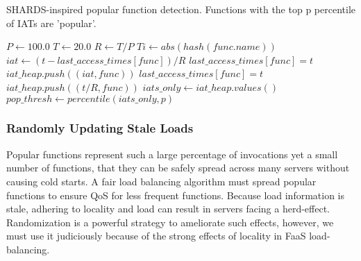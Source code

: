 
\begin{algorithm}
\caption{SHARDS-inspired popular function detection. Functions with the top p percentile of IATs are 'popular'.}
\begin{algorithmic}[1]

 \State $P \gets 100.0$
 \State $T \gets 20.0$ 
 \State $R \gets T / P$ 
 \State $Ti \gets abs(hash(func.name))$ 
  \State $iat \gets (t-last\_access\_times[func])/R$
  \State $last\_access\_times[func] = t$ 
  \State $iat\_heap.push((iat, func))$
  \Else
  \State $last\_access\_times[func] = t$
  \State $iat\_heap.push((t/R, func))$
  \EndIf
 \EndIf
 \State $iats\_only \gets iat\_heap.values()$
 \State $pop\_thresh \gets percentile(iats\_only, p)$
\EndProcedure
\end{algorithmic}
\label{algo:shards-popular}
\end{algorithm}

\vspace*{-0.2cm}
\subsubsection{Randomly Updating Stale Loads}

Popular functions represent such a large percentage of invocations yet a small number of functions, that they can be safely spread across many servers without causing cold starts.
A fair load balancing algorithm must spread popular functions to ensure QoS for less frequent functions. 
Because load information is stale, adhering to locality and load can result in servers facing a herd-effect.
Randomization is a powerful strategy to ameliorate such effects, however, we must use it judiciously because of the strong effects of locality in FaaS load-balancing.

